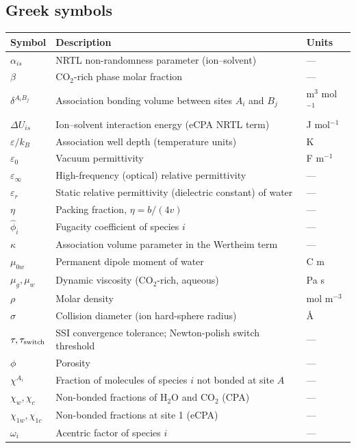 \documentclass[preprint,12pt,authoryear]{elsarticle}
\begin{document}
\subsection*{Greek symbols}

\begin{tabular}{@{}lll@{}}
  \toprule
  Symbol & Description & Units \\
  \midrule
  $\alpha_{is}$ & NRTL non-randomness parameter (ion--solvent) & --- \\
  $\beta$ & CO$_2$-rich phase molar fraction & --- \\
  $\delta^{A_iB_j}$ & Association bonding volume between sites $A_i$ and $B_j$ & m$^3$ mol$^{-1}$ \\
  $\Delta U_{is}$ & Ion--solvent interaction energy (eCPA NRTL term) & J mol$^{-1}$ \\
  $\varepsilon/k_B$ & Association well depth (temperature units) & K \\
  $\varepsilon_0$ & Vacuum permittivity & F m$^{-1}$ \\
  $\varepsilon_\infty$ & High-frequency (optical) relative permittivity & --- \\
  $\varepsilon_r$ & Static relative permittivity (dielectric constant) of water & --- \\
  $\eta$ & Packing fraction, $\eta = b/(4v)$ & --- \\
  $\hat{\phi}_i$ & Fugacity coefficient of species $i$ & --- \\
  $\kappa$ & Association volume parameter in the Wertheim term & --- \\
  $\mu_{0w}$ & Permanent dipole moment of water & C m \\
  $\mu_g, \mu_w$ & Dynamic viscosity (CO$_2$-rich, aqueous) & Pa s \\
  $\rho$ & Molar density & mol m$^{-3}$ \\
  $\sigma$ & Collision diameter (ion hard-sphere radius) & \AA \\
  $\tau, \tau_{\rm switch}$ & SSI convergence tolerance; Newton-polish switch threshold & --- \\
  $\phi$ & Porosity & --- \\
  $\chi^{A_i}$ & Fraction of molecules of species $i$ not bonded at site $A$ & --- \\
  $\chi_w, \chi_c$ & Non-bonded fractions of H$_2$O and CO$_2$ (CPA) & --- \\
  $\chi_{1w}, \chi_{1c}$ & Non-bonded fractions at site 1 (eCPA) & --- \\
  $\omega_i$ & Acentric factor of species $i$ & --- \\
  \bottomrule
\end{tabular}
\end{document}
